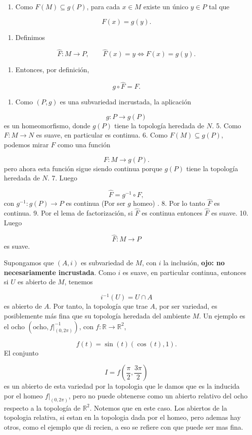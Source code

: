 \begin{bookproof}{}
\begin{enumerate}
\item Como $F(M)\subseteq g(P)$, para cada $x\in M$ existe un único $y\in P$ tal que
\end{enumerate}
\[
F(x)=g(y).
\]
\begin{enumerate}[start=2]
\item Definimos
\end{enumerate}
\[
\widehat F:M\to P,\qquad \widehat F(x)=y \iff F(x)=g(y).
\]
\begin{enumerate}[start=3]
\item Entonces, por definición,
\end{enumerate}
\[
g\circ \widehat F=F.
\]
\begin{enumerate}[start=4]
\item Como $(P,g)$ es una subvariedad incrustada, la aplicación
\end{enumerate}
\[
g:P\to g(P)
\]
es un homeomorfismo, donde $g(P)$ tiene la topología heredada de $N$. 5. Como $F:M\to N$ es suave, en particular es continua. 6. Como $F(M)\subseteq g(P)$, podemos mirar $F$ como una función

\[
F:M\to g(P).
\]
pero ahora esta función sigue siendo continua porque $g(P)$ tiene la topología heredada de $N$. 7. Luego

\[
\widehat F=g^{-1}\circ F,
\]
con $g^{-1}:g(P)\to P$ es continua (Por ser $g$ homeo) . 8. Por lo tanto $\widehat F$ es continua. 9. Por el lema de factorización, si $\widehat F$ es continua entonces $\widehat F$ es suave. 10. Luego

\[
\widehat F:M\to P
\]
es suave.

\bookqed
\end{bookproof}
\label{blk:300685}
\begin{bookremark}{}
Supongamos que $(A,i)$ es subvariedad de $M$, con $i$ la inclusión, \textbf{ojo: no necesariamente incrustada}. Como $i$ es suave, en particular continua, entonces si $U$ es abierto de $M$, tenemos

\[
i^{-1}(U)=U\cap A
\]
es abierto de $A$. Por tanto, la topología que trae $A$, por ser variedad, es posiblemente más fina que su topología heredada del ambiente $M$. Un ejemplo es el ocho $\left(\text{ocho},f|_{(0,2\pi)}^{-1}\right)$, con $f:\mathbb R\to\mathbb R^2$,

\[
f(t)=\sin(t)(\cos(t),1).
\]
El conjunto

\[
I=f\left(\frac{\pi}{2},\frac{3\pi}{2}\right)
\]
es un abierto de esta variedad por la topologia que le damos que es la inducida por el homeo $f|_{(0,2\pi)}$, pero no puede obtenerse como un abierto relativo del ocho respecto a la topología de $\mathbb R^2$. 
 Notemos que en este caso. Los abiertos de la topologia relativa, si estan en la topologia dada por el homeo, pero ademas hay otros, como el ejemplo que di recien, a eso se refiere con que puede ser mas fina.

\end{bookremark}
\label{blk:a7e6ec}
